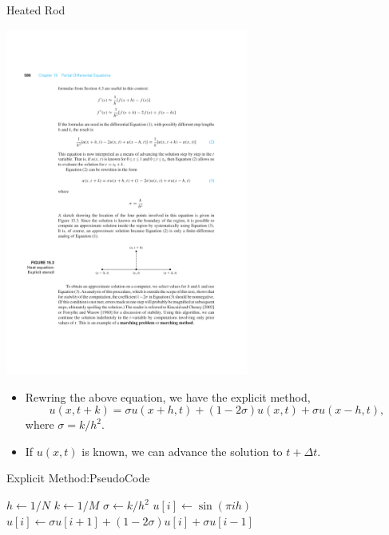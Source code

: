 \documentclass{beamer}
\begin{document}
\begin{frame}{Heated Rod}
    \centerline{\includegraphics[width=0.6\textwidth]{HeatEqnExplicit.pdf}}
    \begin{itemize}
        \item Rewring the above equation, we have the explicit method,
        \[
        u(x, t+k)=\sigma u(x+h, t)+(1-2 \sigma) u(x, t)+\sigma u(x-h, t),
    \]
    where $\sigma=k/h^2$.
    \item If $u(x,t)$ is known, we can advance the solution to $t+\Delta t$.
    \end{itemize}

\end{frame}
\begin{frame}{Explicit Method:PseudoCode}
    \begin{algorithmic}
        \State $h \gets 1/N$
        \State $k \gets 1/M$
        \State $\sigma \gets k/h^2$
        \State $u[i] \gets \sin(\pi i h)$
        \EndFor
        \State $u[i] \gets \sigma u[i+1]+(1-2\sigma)u[i]+\sigma u[i-1]$
        \EndFor
        \EndFor
        \EndProcedure
    \end{algorithmic}
    
\end{frame}
\end{document}
